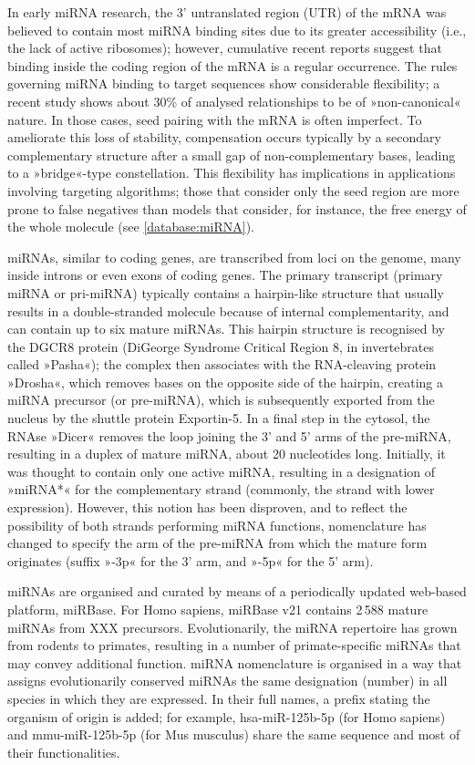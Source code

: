 In early miRNA research, the 3' untranslated region (UTR) of the mRNA was believed to contain most miRNA binding sites due to its greater accessibility (i.e., the lack of active ribosomes); however, cumulative recent reports suggest that binding inside the coding region of the mRNA is a regular occurrence. The rules governing miRNA binding to target sequences show considerable flexibility; a recent study shows about 30\% of analysed relationships to be of »non-canonical« nature. In those cases, seed pairing with the mRNA is often imperfect. To ameliorate this loss of stability, compensation occurs typically by a secondary complementary structure after a small gap of non-complementary bases, leading to a »bridge«-type constellation.  This flexibility has implications in applications involving targeting algorithms; those that consider only the seed region are more prone to false negatives than models that consider, for instance, the free energy of the whole molecule (see \ref{database:miRNA}).

miRNAs, similar to coding genes, are transcribed from loci on the genome, many inside introns or even exons of coding genes\cite{Rodriguez2004}. The primary transcript (primary miRNA or pri-miRNA) typically contains a hairpin-like structure that usually results in a double-stranded molecule because of internal complementarity, and can contain up to six mature miRNAs. This hairpin structure is recognised by the DGCR8 protein (DiGeorge Syndrome Critical Region 8, in invertebrates called »Pasha«); the complex then associates with the RNA-cleaving protein »Drosha«, which removes bases on the opposite side of the hairpin, creating a miRNA precursor (or pre-miRNA), which is subsequently exported from the nucleus by the shuttle protein Exportin-5. In a final step in the cytosol, the RNAse »Dicer« removes the loop joining the 3' and 5' arms of the pre-miRNA, resulting in a duplex of mature miRNA, about 20 nucleotides long. Initially, it was thought to contain only one active miRNA, resulting in a designation of »miRNA*« for the complementary strand (commonly, the strand with lower expression). However, this notion has been disproven, and to reflect the possibility of both strands performing miRNA functions, nomenclature has changed to specify the arm of the pre-miRNA from which the mature form originates (suffix »-3p« for the 3' arm, and »-5p« for the 5' arm).

miRNAs are organised and curated by means of a periodically updated web-based platform, miRBase\cite{Kozomara2019}. For Homo sapiens, miRBase v21 contains 2\,588 mature miRNAs from XXX precursors. Evolutionarily, the miRNA repertoire has grown from rodents to primates, resulting in a number of primate-specific miRNAs that may convey additional function. miRNA nomenclature is organised\cite{Ambros2003} in a way that assigns evolutionarily conserved miRNAs the same designation (number) in all species in which they are expressed. In their full names, a prefix stating the organism of origin is added; for example, hsa-miR-125b-5p (for Homo sapiens) and mmu-miR-125b-5p (for Mus musculus) share the same sequence and most of their functionalities.

